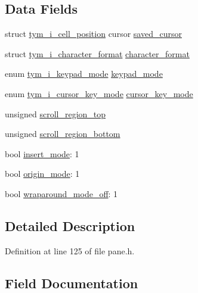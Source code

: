 \subsection*{Data Fields}
\begin{DoxyCompactItemize}
\item 
struct \hyperlink{structtym__i__cell__position}{tym\+\_\+i\+\_\+cell\+\_\+position} cursor \hyperlink{structtym__i__pane__screen__state_aa67b24ce660b6da6aa9393b3f3acd61d}{saved\+\_\+cursor}
\item 
struct \hyperlink{structtym__i__character__format}{tym\+\_\+i\+\_\+character\+\_\+format} \hyperlink{structtym__i__pane__screen__state_a868cd2d97f372aacca0afaf7b42608e9}{character\+\_\+format}
\item 
enum \hyperlink{pane_8h_afec42adba111d829539aa660cfd36619}{tym\+\_\+i\+\_\+keypad\+\_\+mode} \hyperlink{structtym__i__pane__screen__state_a9373bd32028eb3b205d1381e8ff7e13e}{keypad\+\_\+mode}
\item 
enum \hyperlink{pane_8h_af72f527ead3cfb25d576d72dba239ba9}{tym\+\_\+i\+\_\+cursor\+\_\+key\+\_\+mode} \hyperlink{structtym__i__pane__screen__state_a884bae9505ac220fa9a09105bef0f0b2}{cursor\+\_\+key\+\_\+mode}
\item 
unsigned \hyperlink{structtym__i__pane__screen__state_af3665243e3d6dc3e117edc2cc4486144}{scroll\+\_\+region\+\_\+top}
\item 
unsigned \hyperlink{structtym__i__pane__screen__state_ad50d422fce8986b77b5a50267f7c9896}{scroll\+\_\+region\+\_\+bottom}
\item 
bool \hyperlink{structtym__i__pane__screen__state_a7170520b3f9887e5ba5726851ec3169e}{insert\+\_\+mode}\+: 1
\item 
bool \hyperlink{structtym__i__pane__screen__state_a1a02345aba0a0a93696e4892fcea3551}{origin\+\_\+mode}\+: 1
\item 
bool \hyperlink{structtym__i__pane__screen__state_aa47e037b07d6b0d8e14a32c9ad13dd0d}{wraparound\+\_\+mode\+\_\+off}\+: 1
\end{DoxyCompactItemize}


\subsection{Detailed Description}


Definition at line 125 of file pane.\+h.



\subsection{Field Documentation}
\mbox{\label{structtym__i__pane__screen__state_a868cd2d97f372aacca0afaf7b42608e9}} 

